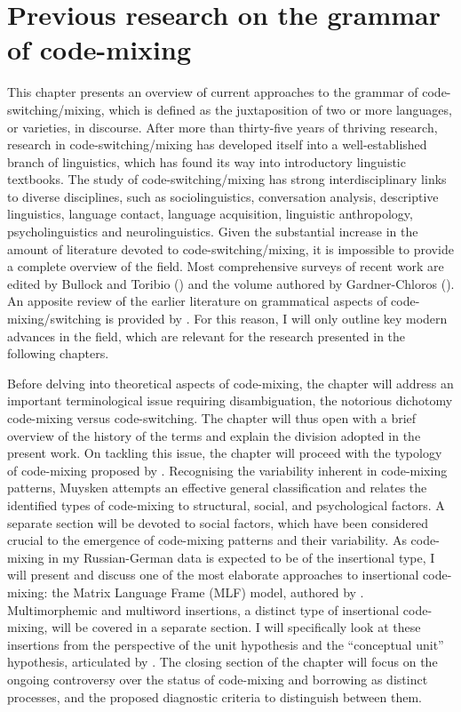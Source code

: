 \chapter{Previous research on the grammar of code-mixing}\label{CM}
This chapter presents an overview of current approaches to the grammar of code-switching/mixing, which is defined as the juxtaposition of two or more languages, or varieties, in discourse. After more than thirty-five years of thriving research, research in code-switching/mixing has developed itself into a well-established branch of linguistics, which has found its way into introductory linguistic textbooks. The study of code-switching/mixing has strong interdisciplinary links to diverse disciplines, such as sociolinguistics, conversation analysis, descriptive linguistics, language contact, language acquisition, linguistic anthropology, psycholinguistics and neurolinguistics. Given the substantial increase in the amount of literature devoted to code-switching/mixing, it is impossible to provide a complete overview of the field. Most comprehensive surveys of recent work are  edited by Bullock and Toribio (\citeyear{bullock-toribio}) and the volume  authored by Gardner-Chloros (\citeyear{gardner-chloros_code-switching_2009}). An apposite review of the earlier literature on grammatical aspects of code-mixing/switching is provided by  \citet[Chapter 1]{boumans-syntax-1998}. For this reason, I will only outline key modern advances in the field, which are relevant for the research presented in the following chapters. 

Before delving into theoretical aspects of code-mixing, the chapter will address an important terminological issue requiring disambiguation, the notorious dichotomy code-mixing versus code-switching. The chapter will thus open with a brief overview of the history of the terms and explain the division adopted in the present work. On tackling this issue, the chapter will proceed with the typology of code-mixing proposed by \citet[][]{muysken-bilingual-2000}. Recognising the variability inherent in code-mixing patterns, Muysken attempts an effective general classification and relates the identified types of code-mixing to structural, social, and psychological factors. A separate section will be devoted to social factors, which have been considered crucial to the emergence of  code-mixing patterns and their variability. As code-mixing in my Russian-German data is expected to be of the insertional type, I will present and discuss one of the most elaborate approaches to insertional code-mixing: the Matrix Language Frame (MLF) model, authored by \citet[][]{myers-scotton-duelling-1993,myers-scotton-contact-2002}. Multimorphemic and multiword insertions, a distinct type of insertional code-mixing, will be covered in a separate section. I will specifically look at these insertions from the perspective of the unit hypothesis and the ``conceptual unit'' hypothesis, articulated by \citet[][]{backus-evidence-1999,backus-units-2003}. The closing section of the chapter will focus on the ongoing controversy over the status of code-mixing and borrowing as distinct processes, and the proposed diagnostic criteria to distinguish between them. 

